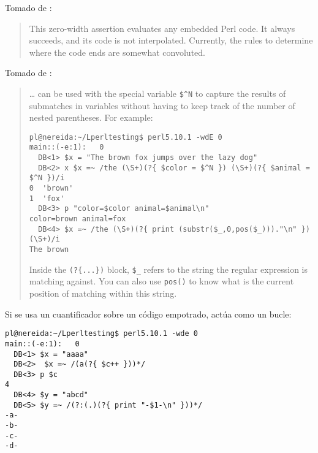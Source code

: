 
Tomado de :

\begin{it}\begin{quote}
This zero-width assertion evaluates any embedded Perl code. It always
succeeds, and its code  is not interpolated. Currently, the rules to
determine where the code  ends are somewhat convoluted.
\end{quote}\end{it}


Tomado de :
\begin{it}\begin{quote}
\ldots{} can be used with the special variable \verb|$^N| to
capture the results of submatches in variables without having to keep
track of the number of nested parentheses. For example:

\begin{verbatim}
pl@nereida:~/Lperltesting$ perl5.10.1 -wdE 0
main::(-e:1):   0
  DB<1> $x = "The brown fox jumps over the lazy dog"
  DB<2> x $x =~ /the (\S+)(?{ $color = $^N }) (\S+)(?{ $animal = $^N })/i
0  'brown'
1  'fox'
  DB<3> p "color=$color animal=$animal\n"
color=brown animal=fox
  DB<4> $x =~ /the (\S+)(?{ print (substr($_,0,pos($_)))."\n" }) (\S+)/i
The brown
\end{verbatim}

Inside the \verb|(?{...})| block, \verb|$_| refers to the string the
regular expression is matching against. You can also use \verb|pos()| to know
what is the current position of matching within this string.
\end{quote}\end{it}


Si se usa un cuantificador sobre un código empotrado,
actúa como un bucle:

\begin{verbatim}
pl@nereida:~/Lperltesting$ perl5.10.1 -wde 0
main::(-e:1):   0
  DB<1> $x = "aaaa"
  DB<2>  $x =~ /(a(?{ $c++ }))*/
  DB<3> p $c
4
  DB<4> $y = "abcd"
  DB<5> $y =~ /(?:(.)(?{ print "-$1-\n" }))*/
-a-
-b-
-c-
-d-
\end{verbatim}


